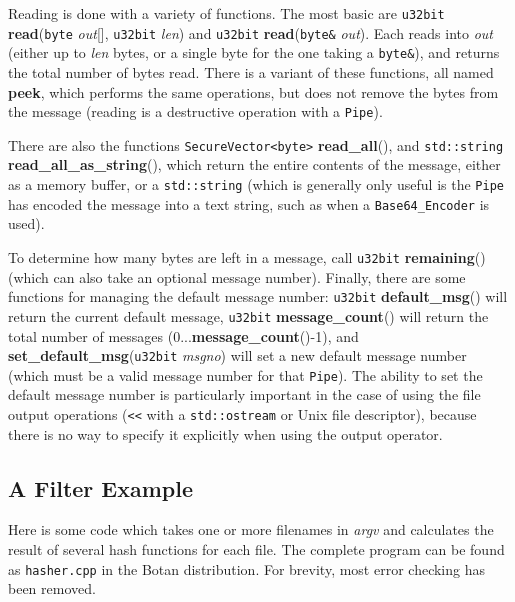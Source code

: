 \documentclass{article}
\newcommand{\filename}[1]{\texttt{#1}}
\newcommand{\function}[1]{\textbf{#1}}
\newcommand{\type}[1]{\texttt{#1}}
\renewcommand{\arg}[1]{\textsl{#1}}
\begin{document}
Reading is done with a variety of functions. The most basic are \type{u32bit}
\function{read}(\type{byte} \arg{out}[], \type{u32bit} \arg{len}) and
\type{u32bit} \function{read}(\type{byte\&} \arg{out}). Each reads into
\arg{out} (either up to \arg{len} bytes, or a single byte for the one taking a
\type{byte\&}), and returns the total number of bytes read. There is a variant
of these functions, all named \function{peek}, which performs the same
operations, but does not remove the bytes from the message (reading is a
destructive operation with a \type{Pipe}).

There are also the functions \type{SecureVector<byte>} \function{read\_all}(),
and \type{std::string} \function{read\_all\_as\_string}(), which return the
entire contents of the message, either as a memory buffer, or a
\type{std::string} (which is generally only useful is the \type{Pipe} has
encoded the message into a text string, such as when a \type{Base64\_Encoder}
is used).

To determine how many bytes are left in a message, call \type{u32bit}
\function{remaining}() (which can also take an optional message
number). Finally, there are some functions for managing the default message
number: \type{u32bit} \function{default\_msg}() will return the current default
message, \type{u32bit} \function{message\_count}() will return the total number
of messages (0...\function{message\_count}()-1), and
\function{set\_default\_msg}(\type{u32bit} \arg{msgno}) will set a new default
message number (which must be a valid message number for that \type{Pipe}). The
ability to set the default message number is particularly important in the case
of using the file output operations (\verb|<<| with a \type{std::ostream} or
Unix file descriptor), because there is no way to specify it explicitly when
using the output operator.

\pagebreak

\subsection{A Filter Example}

Here is some code which takes one or more filenames in \arg{argv} and
calculates the result of several hash functions for each file. The complete
program can be found as \filename{hasher.cpp} in the Botan distribution. For
brevity, most error checking has been removed.
\end{document}
